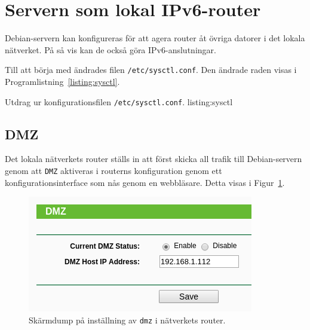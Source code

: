 %
%
%


\section{Servern som lokal IPv6-router}
Debian-servern kan konfigureras för att agera router åt övriga datorer i det
lokala nätverket. På så vis kan de också göra IPv6-anslutningar.

Till att börja med ändrades filen \texttt{/etc/sysctl.conf}. 
Den ändrade raden visas i Programlistning~\ref{listing:sysctl}.

             {Utdrag ur konfigurationsfilen \texttt{/etc/sysctl.conf}.}
             {listing:sysctl}

\subsection{DMZ}
Det lokala nätverkets router ställs in att först skicka all trafik till
Debian-servern genom att \texttt{DMZ} aktiveras i routerns konfiguration genom
ett konfigurationsinterface som nås genom en webbläsare.  
Detta visas i Figur~\ref{fig:dmz}.

\begin{figure}[H]
  \centering
  \includegraphics[width=0.5\linewidth]{include/dmz}
  \caption[Skärmdump på inställning av \texttt{dmz}]
          {Skärmdump på inställning av \texttt{dmz} i nätverkets router.}
  \label{fig:dmz}
\end{figure}



